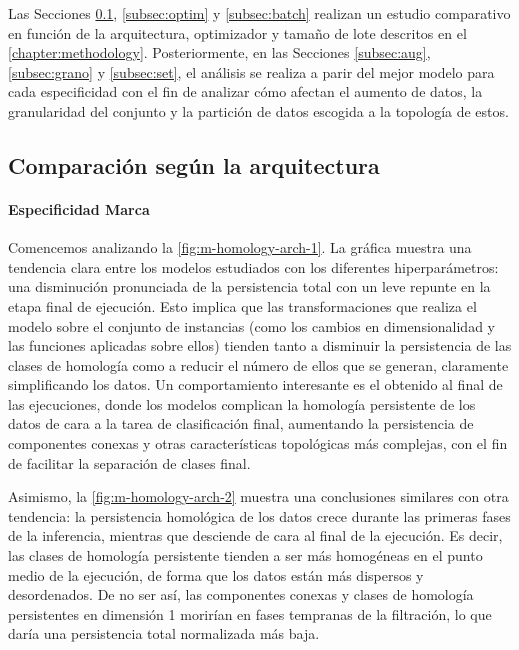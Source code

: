 Las Secciones \ref{subsec:arch}, \ref{subsec:optim} y \ref{subsec:batch} realizan
un estudio comparativo en función de la arquitectura, optimizador y tamaño de
lote descritos en el \autoref{chapter:methodology}. Posteriormente, en las
Secciones \ref{subsec:aug}, \ref{subsec:grano} y \ref{subsec:set}, el análisis
se realiza a parir del mejor modelo para cada especificidad con el fin de
analizar cómo afectan el aumento de datos, la granularidad del conjunto y la partición
de datos escogida a la topología de estos.

\subsection{Comparación según la arquitectura}
\label{subsec:arch}

\paragraph{Especificidad Marca}

Comencemos analizando la \autoref{fig:m-homology-arch-1}. La gráfica muestra una
tendencia clara entre los modelos estudiados con los diferentes hiperparámetros:
una disminución pronunciada de la persistencia total con un leve repunte en la
etapa final de ejecución. Esto implica que las transformaciones que realiza el modelo
sobre el conjunto de instancias (como los cambios en dimensionalidad y las
funciones aplicadas sobre ellos) tienden tanto a disminuir la persistencia de las
clases de homología como a reducir el número de ellos que se generan, claramente
simplificando los datos. Un comportamiento interesante es el obtenido al final de
las ejecuciones, donde los modelos complican la homología persistente de los
datos de cara a la tarea de clasificación final, aumentando la persistencia de componentes
conexas y otras características topológicas más complejas, con el fin de
facilitar la separación de clases final.

Asimismo, la \autoref{fig:m-homology-arch-2} muestra una conclusiones similares con
otra tendencia: la persistencia homológica de los datos crece durante las
primeras fases de la inferencia, mientras que desciende de cara al final de la ejecución.
Es decir, las clases de homología persistente tienden a ser más homogéneas en el
punto medio de la ejecución, de forma que los datos están más dispersos y
desordenados. De no ser así, las componentes conexas y clases de homología
persistentes en dimensión 1 morirían en fases tempranas de la filtración, lo que
daría una persistencia total normalizada más baja.

